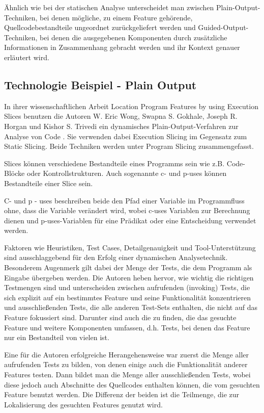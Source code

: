 \documentclass[runningheads,a4paper]{llncs}
\begin{document}
Ähnlich wie bei der statischen Analyse unterscheidet man zwischen Plain-Output-Techniken, bei denen mögliche, zu einem Feature gehörende, Quellcodebestandteile ungeordnet zurückgeliefert werden und Guided-Output-Techniken, bei denen die ausgegebenen Komponenten durch zusätzliche Informationen in Zusammenhang gebracht werden und ihr Kontext genauer erläutert wird. 

\subsection*{Technologie Beispiel - Plain Output}

In ihrer wissenschaftlichen Arbeit Location Program Features by using Execution Slices benutzen die Autoren W. Eric Wong, Swapna S. Gokhale, Joseph R. Horgan und Kishor S. Trivedi ein dynamisches Plain-Output-Verfahren zur Analyse von Code \cite{Executionslices}. Sie verwenden dabei Execution Slicing im Gegensatz zum Static Slicing. Beide Techniken werden unter Program Slicing zusammengefasst.

Slices können verschiedene Bestandteile eines Programms sein wie z.B. Code-Blöcke oder Kontrollstrukturen. Auch sogenannte c- und p-uses können Bestandteile einer Slice sein.

C- und p - uses beschreiben beide den Pfad einer Variable im Programmfluss ohne, dass die Variable verändert wird, wobei c-uses Variablen zur Berechnung dienen und p-uses-Variablen für eine Prädikat oder eine Entscheidung verwendet werden.

Faktoren wie Heuristiken, Test Cases, Detailgenauigkeit und Tool-Unterstützung sind ausschlaggebend für den Erfolg einer dynamischen Analysetechnik. Besonderem Augenmerk gilt dabei der Menge der Tests, die dem Programm als Eingabe übergeben werden. Die Autoren heben hervor, wie wichtig die richtigen Testmengen sind und unterscheiden zwischen aufrufenden (invoking) Tests, die sich explizit auf ein bestimmtes Feature und seine Funktionalität konzentrieren und ausschließenden Tests, die alle anderen Test-Sets enthalten, die nicht auf das Feature fokussiert sind. Darunter sind auch die zu finden, die das gesuchte Feature und weitere Komponenten umfassen, d.h. Tests, bei denen das Feature nur ein Bestandteil von vielen ist.

Eine für die Autoren erfolgreiche Herangehensweise war zuerst die Menge aller aufrufenden Tests zu bilden, von denen einige auch die Funktionalität anderer Features testen. Dann bildet man die Menge aller ausschließenden Tests, wobei diese jedoch auch Abschnitte des Quellcodes enthalten können, die vom gesuchten Feature benutzt werden. Die Differenz der beiden ist die Teilmenge, die zur Lokalisierung des gesuchten Features genutzt wird.
\end{document}
